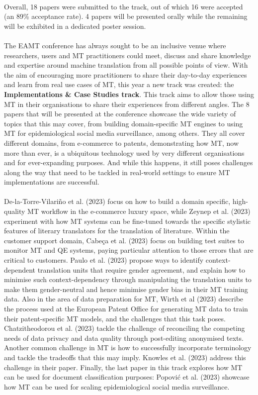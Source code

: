 \documentclass[a4paper,11pt,twoside]{book}
\begin{document}
\begin{onehalfspacing}
\\
\noindent
Overall, 18 papers were submitted to the track, out of which 16 were accepted (an 89\% acceptance rate). 4 papers will be presented orally while the remaining will be exhibited in a dedicated poster session.\\
\\
\noindent
The EAMT conference has always sought to be an inclusive venue where researchers, users and MT practitioners could meet, discuss and share knowledge and expertise around machine translation from all possible points of view. With the aim of encouraging more practitioners to share their day-to-day experiences and learn from real use cases of MT, this year a new track was created: the \textbf{Implementations \& Case Studies track}. This track aims to allow those using MT in their organisations to share their experiences from different angles. The 8 papers that will be presented at the conference showcase the wide variety of topics that this may cover, from building domain-specific MT engines to using MT for epidemiological social media surveillance, among others. They all cover different domains, from e-commerce to patents, demonstrating how MT, now more than ever, is a ubiquitous technology used by very different organisations and for ever-expanding purposes. And while this happens, it still poses challenges along the way that need to be tackled in real-world settings to ensure MT implementations are successful.\\
\\
\noindent
De-la-Torre-Vilariño et al. (2023) focus on how to build a domain specific, high-quality MT workflow in the e-commerce luxury space, while Zeynep et al. (2023) experiment with how MT systems can be fine-tuned towards the specific stylistic features of literary translators for the translation of literature. Within the customer support domain, Cabeça et al. (2023) focus on building test suites to monitor MT and QE systems, paying particular attention to those errors that are critical to customers. Paulo et al. (2023) propose ways to identify context-dependent translation units that require gender agreement, and explain how to minimise such context-dependency through manipulating the translation units to make them gender-neutral and hence minimise gender bias in their MT training data. Also in the area of data preparation for MT, Wirth et al (2023) describe the process used at the European Patent Office for generating MT data to train their patent-specific MT models, and the challenges that this task poses. Chatzitheodorou et al. (2023) tackle the challenge of reconciling the competing needs of data privacy and data quality through post-editing anonymised texts. Another common challenge in MT is how to successfully incorporate terminology and tackle the tradeoffs that this may imply. Knowles et al. (2023) address this challenge in their paper. Finally, the last paper in this track explores how MT can be used for document classification purposes: Popović et al. (2023) showcase how MT can be used for scaling epidemiological social media surveillance.\\

\end{onehalfspacing}
\end{document}
